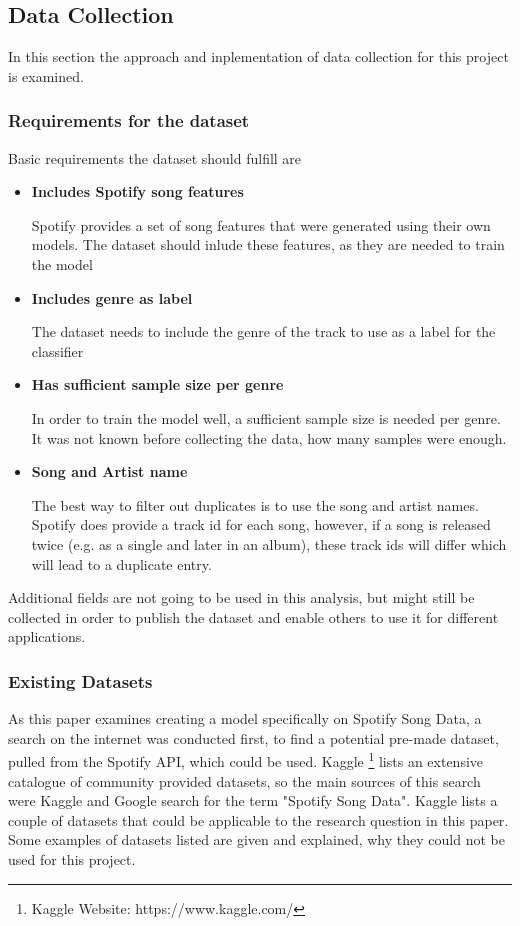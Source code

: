 \subsection{Data Collection}

In this section the approach and inplementation of data collection for this project is 
examined.

\subsubsection{Requirements for the dataset}

Basic requirements the dataset should fulfill are

\begin{itemize}
    \item \textbf{Includes Spotify song features}

    Spotify provides a set of song features that were generated using their own models.
    The dataset should inlude these features, as they are needed to train the model
    \item \textbf{Includes genre as label}

    The dataset needs to include the genre of the track to use as a label for the classifier
    \item \textbf{Has sufficient sample size per genre}

    In order to train the model well, a sufficient sample size is needed per genre.
    It was not known before collecting the data, how many samples were enough. 
    \item \textbf{Song and Artist name}

    The best way to filter out duplicates is to use the song and artist names.
    Spotify does provide a track id for each song, however, if a song is released twice
    (e.g. as a single and later in an album), these track ids will differ which will lead to a duplicate entry.
\end{itemize}

Additional fields are not going to be used in this analysis, but might still be collected in order to publish the
dataset and enable others to use it for different applications.

\subsubsection{Existing Datasets}

As this paper examines creating a model specifically on Spotify Song Data,
a search on the internet was conducted first, to find a potential pre-made dataset,
pulled from the Spotify \ac{API}, which could be used.
Kaggle \footnote{Kaggle Website: https://www.kaggle.com/} lists an extensive
catalogue of community provided datasets, so the main sources of this search were
Kaggle and Google search for the term "Spotify Song Data".
Kaggle lists a couple of datasets that could be applicable to the research question in
this paper. Some examples of datasets listed are given and explained, why they could not 
be used for this project.

